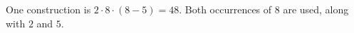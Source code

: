 One construction is $\boxed{2\cdot8\cdot(8-5)=48}$. Both occurrences of $8$ are used, along with $2$ and $5$.
